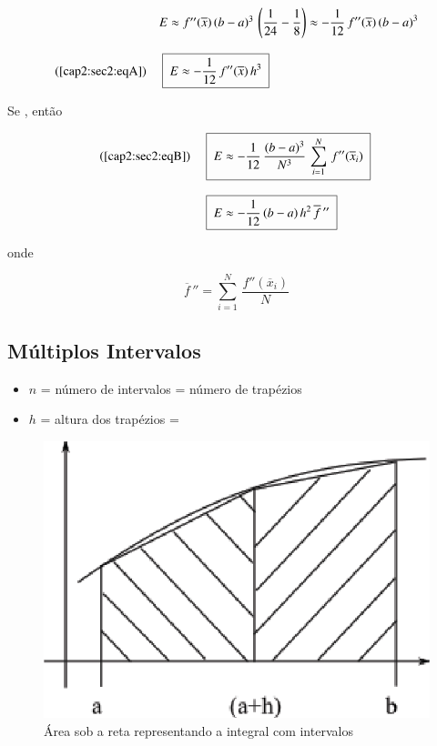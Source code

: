 \[
 \begin{array}{ll}
  & E \approx f''(\overline{x}) \, (b - a)^3 \, \left(\displaystyle \frac{1}{24} - \frac{1}{8}\right) \approx - \displaystyle \frac{1}{12} \, f''(\overline{x}) \, (b - a)^3 \\
  \\
  (\ref{cap2:sec2:eqA}) & \mbox{ \framebox{ $ E \approx - \displaystyle \frac{1}{12} \, f''(\overline{x}) \, h^3 $ } }
 \end{array}
\]

Se , então

\[
 \begin{array}{ll}
  (\ref{cap2:sec2:eqB}) & \mbox{ \framebox{ $ E \approx - \displaystyle \frac{1}{12} \, \frac{(b - a)^3}{N^3} \, \sum_{i=1}^N \, f''(\overline{x}_i) $ } } \\
  \\
  & \mbox{ \framebox{ $ E \approx - \displaystyle \frac{1}{12} \, (b - a) \, h^2 \, \overline{f}\,'' $ } }
 \end{array}
\]

onde

\[
 \overline{f}\,'' = \sum_{i=1}^N \, \frac{f''(\overline{x}_i)}{N}
\]

\subsection{Múltiplos Intervalos}

\begin{itemize}
 \item $n$ = número de intervalos = número de trapézios
\item $h$ = altura dos trapézios = 
\end{itemize}

\begin{figure}[htb]
 \centering
 \includegraphics[scale=0.8]{capitulos/capitulo2/figuras/regra_trapezio2.eps}
 \caption{Área sob a reta representando a integral com intervalos}
 \label{fig:regra_trapezio2}
\end{figure}

